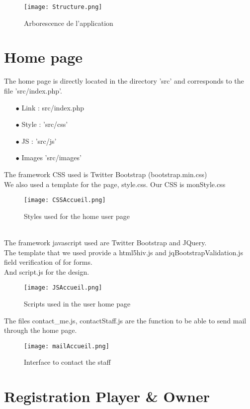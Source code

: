 \documentclass{article}
\begin{document}
\begin{figure}[H]
\centering
\texttt{[image: Structure.png]}
\caption{Arborescence de l'application}
\end{figure}


\section{Home page}
The home page is directly located in the directory 'src' and corresponds to the file 'src/index.php'.

\begin{itemize}
\item[$\bullet$] Link : src/index.php
\item[$\bullet$] Style : 'src/css'
\item[$\bullet$] JS : 'src/js'
\item[$\bullet$] Images 'src/images'
\end{itemize}

The framework CSS used is Twitter Bootstrap (bootstrap.min.css)\\
We also used a template for the page, style.css.
Our CSS is monStyle.css\\
\begin{figure}[H]
\centering
\texttt{[image: CSSAccueil.png]}
\caption{Styles used for the home user page}
\end{figure}

\\
The framework javascript used are Twitter Bootstrap and JQuery.\\
The template that we used provide a html5hiv.js and jqBootstrapValidation.js field verification of for forms.\\
And script.js for the design.\\
\begin{figure}[H]
\centering
\texttt{[image: JSAccueil.png]}
\caption{Scripts used in the user home page}
\end{figure}

The files contact\_me.js, contactStaff.js are the function to be able to send mail through the home page.
\begin{figure}[H]
\centering
\texttt{[image: mailAccueil.png]}
\caption{Interface to contact the staff}
\end{figure}

\section{Registration Player \& Owner}
\end{document}
